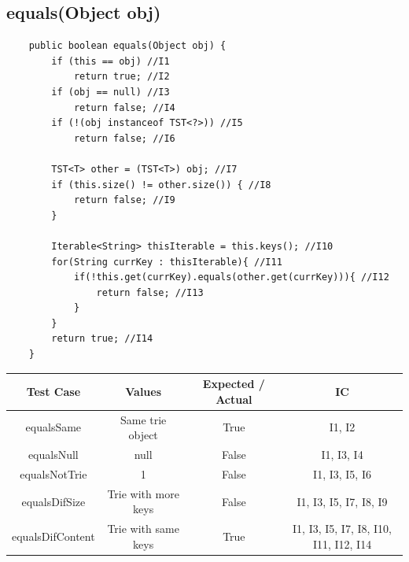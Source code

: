\documentclass[12pt]{article}
\begin{document}
\subsection{equals(Object obj)}
\begin{lstlisting}
	public boolean equals(Object obj) {
		if (this == obj) //I1
			return true; //I2
		if (obj == null) //I3
			return false; //I4
		if (!(obj instanceof TST<?>)) //I5
			return false; //I6
		
		TST<T> other = (TST<T>) obj; //I7
		if (this.size() != other.size()) { //I8
			return false; //I9
		}
			
		Iterable<String> thisIterable = this.keys(); //I10
        for(String currKey : thisIterable){ //I11
            if(!this.get(currKey).equals(other.get(currKey))){ //I12
                return false; //I13
            }
        }
		return true; //I14
	}
\end{lstlisting}

\begin{table}[htb]
\centering
\begin{tabular}{| c | c | c | c |} 
 \hline
 Test Case & Values & Expected / Actual & IC\\ \hline
 equalsSame & Same trie object & True & I1, I2 \\ \hline
 equalsNull & null & False & I1, I3, I4 \\ \hline
 equalsNotTrie & 1 & False & I1, I3, I5, I6 \\ \hline
 equalsDifSize & Trie with more keys & False & I1, I3, I5, I7, I8, I9 \\ \hline
 equalsDifContent & Trie with same keys & True & I1, I3, I5, I7, I8, I10, I11, I12, I14 \\ \hline

\end{tabular}
\end{table}
\end{document}
